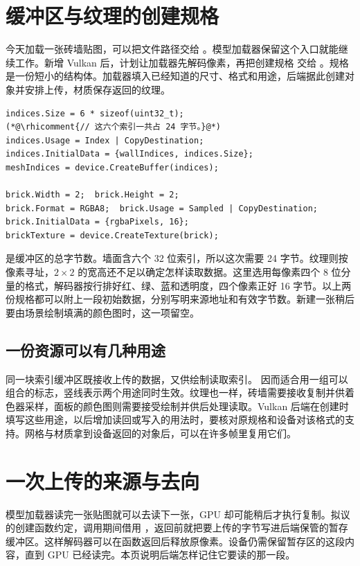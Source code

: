 \clearpage
\section{缓冲区与纹理的创建规格}\label{sec:data-device}
今天加载一张砖墙贴图，可以把文件路径交给 。模型加载器保留这个入口就能继续工作。新增 Vulkan 后，计划让加载器先解码像素，再把创建规格 交给 。规格是一份短小的结构体。加载器填入已经知道的尺寸、格式和用途，后端据此创建对象并安排上传，材质保存返回的纹理。

\begin{lstlisting}
indices.Size = 6 * sizeof(uint32_t);
(*@\rhicomment{// 这六个索引一共占 24 字节。}@*)
indices.Usage = Index | CopyDestination;
indices.InitialData = {wallIndices, indices.Size};
meshIndices = device.CreateBuffer(indices);

brick.Width = 2;  brick.Height = 2;
brick.Format = RGBA8;  brick.Usage = Sampled | CopyDestination;
brick.InitialData = {rgbaPixels, 16};
brickTexture = device.CreateTexture(brick);
\end{lstlisting}

 是缓冲区的总字节数。墙面含六个 32 位索引，所以这次需要 24 字节。纹理则按像素寻址，$2\times2$ 的宽高还不足以确定怎样读取数据。这里选用每像素四个 8 位分量的格式，解码器按行排好红、绿、蓝和透明度，四个像素正好 16 字节。以上两份规格都可以附上一段初始数据，分别写明来源地址和有效字节数。新建一张稍后要由场景绘制填满的颜色图时，这一项留空。

\subsection{一份资源可以有几种用途}
同一块索引缓冲区既接收上传的数据，又供绘制读取索引。 因而适合用一组可以组合的标志，竖线表示两个用途同时生效。纹理也一样，砖墙需要接收复制并供着色器采样，面板的颜色图则需要接受绘制并供后处理读取。Vulkan 后端在创建时填写这些用途，以后增加读回或写入的用法时，要核对原规格和设备对该格式的支持。网格与材质拿到设备返回的对象后，可以在许多帧里复用它们。

\clearpage
\section{一次上传的来源与去向}\label{sec:data-upload}
模型加载器读完一张贴图就可以去读下一张，GPU 却可能稍后才执行复制。拟议的创建函数约定，调用期间借用 ，返回前就把要上传的字节写进后端保管的暂存缓冲区。这样解码器可以在函数返回后释放原像素。设备仍需保留暂存区的这段内容，直到 GPU 已经读完。本页说明后端怎样记住它要读的那一段。

